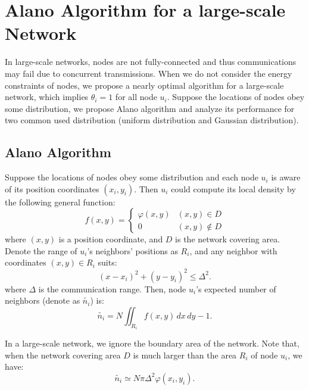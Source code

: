 \section{Alano Algorithm for a large-scale Network}
\label{PCN}


In large-scale networks, nodes are not fully-connected and thus communications may fail due to concurrent transmissions. 
When we do not consider the energy constraints of nodes, we propose a nearly optimal algorithm for a large-scale network, which implies $\theta_i = 1$ for all node $u_i$.
Suppose the locations of nodes obey some distribution, we propose Alano algorithm and analyze its performance for two common used distribution (uniform distribution and Gaussian distribution).

\subsection{Alano Algorithm}
Suppose the locations of nodes obey some distribution and each node $u_i$ is aware of its position coordinates $(x_i, y_i)$.
Then $u_i$ could compute its local density by the following general function: %
$$f(x,y)=
\begin{cases}
\varphi(x,y)& (x,y)\in D\\
0& (x,y)\notin D
\end{cases}$$
where $(x,y)$ is a position coordinate, and $D$ is the network covering area.
Denote the range of $u_i$'s neighbors' positions as $R_i$,  and any neighbor with coordinates $(x,y) \in R_i$ suits:
$$
(x-x_i)^2+(y-y_i)^2 \leq \Delta^2.
$$
where $\Delta$ is the communication range. Then, node $u_i$'s expected number of neighbors (denote as $\widetilde{n_i}$) is:
$$
\widetilde{n_i} = N\iint_{R_i} f(x,y)\,dx\,dy - 1.
$$

In a large-scale network, we ignore the boundary area of the network.  %
Note that, when the network covering area $D$ is much larger than the area $R_i$ of node $u_i$, we have:
\begin{equation}
\label{eqnNB}
\widetilde{n_i} \simeq N\pi \Delta^2 \varphi(x_i,y_i).
\end{equation}


